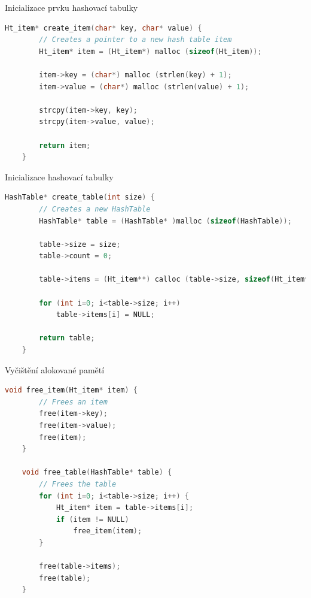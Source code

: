 \documentclass{beamer}
\begin{document}
    \begin{frame}[fragile]{Inicializace prvku hashovací tabulky}
        \begin{lstlisting}[language=C]
    Ht_item* create_item(char* key, char* value) {
        // Creates a pointer to a new hash table item
        Ht_item* item = (Ht_item*) malloc (sizeof(Ht_item));
        
        item->key = (char*) malloc (strlen(key) + 1);
        item->value = (char*) malloc (strlen(value) + 1);
        
        strcpy(item->key, key);
        strcpy(item->value, value);
        
        return item;
    }
        \end{lstlisting}
    \end{frame}
    
    \begin{frame}[fragile]{Inicializace hashovací tabulky}
        \begin{lstlisting}[language=C]
    HashTable* create_table(int size) {
        // Creates a new HashTable
        HashTable* table = (HashTable* )malloc (sizeof(HashTable));
        
        table->size = size;
        table->count = 0;
        
        table->items = (Ht_item**) calloc (table->size, sizeof(Ht_item*));
        
        for (int i=0; i<table->size; i++)
            table->items[i] = NULL;
            
        return table;
    }
        \end{lstlisting}
    \end{frame}
    
    \begin{frame}[fragile]{Vyčištění alokované pamětí}
        \begin{lstlisting}[language=C]
    void free_item(Ht_item* item) {
        // Frees an item
        free(item->key);
        free(item->value);
        free(item);
    }
     
    void free_table(HashTable* table) {
        // Frees the table
        for (int i=0; i<table->size; i++) {
            Ht_item* item = table->items[i];
            if (item != NULL)
                free_item(item);
        }
     
        free(table->items);
        free(table);
    }
        \end{lstlisting}
    \end{frame}
    
\end{document}
